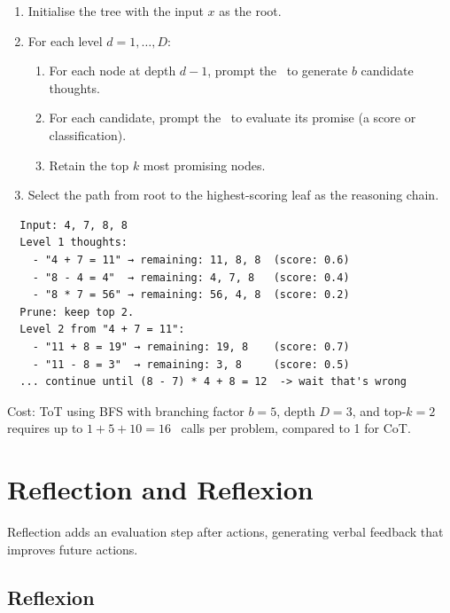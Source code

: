 \begin{algorithm}
	\begin{enumerate}
		\item Initialise the tree with the input $x$ as the root.
		\item For each level $d = 1, \dots, D$:
		      \begin{enumerate}
			      \item For each node at depth $d-1$, prompt the \llm\ to generate $b$ candidate thoughts.
			      \item For each candidate, prompt the \llm\ to evaluate its promise (a score or classification).
			      \item Retain the top $k$ most promising nodes.
		      \end{enumerate}
		\item Select the path from root to the highest-scoring leaf as the reasoning chain.
	\end{enumerate}
\end{algorithm}

\begin{example}
	\begin{lstlisting}
  Input: 4, 7, 8, 8
  Level 1 thoughts:
    - "4 + 7 = 11" → remaining: 11, 8, 8  (score: 0.6)
    - "8 - 4 = 4"  → remaining: 4, 7, 8   (score: 0.4)
    - "8 * 7 = 56" → remaining: 56, 4, 8  (score: 0.2)
  Prune: keep top 2.
  Level 2 from "4 + 7 = 11":
    - "11 + 8 = 19" → remaining: 19, 8    (score: 0.7)
    - "11 - 8 = 3"  → remaining: 3, 8     (score: 0.5)
  ... continue until (8 - 7) * 4 + 8 = 12  -> wait that's wrong
  \end{lstlisting}
\end{example}

Cost: ToT using BFS with branching factor $b=5$, depth $D=3$, and top-$k=2$ requires up to $1 + 5 + 10 = 16$ \llm\ calls per problem, compared to 1 for CoT.

\section{Reflection and Reflexion}

Reflection adds an evaluation step after actions, generating verbal feedback that improves future actions.

\subsection{Reflexion}

